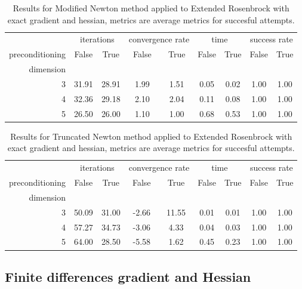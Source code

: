 \begin{table}
\centering
\caption{Results for Modified Newton method applied to Extended Rosenbrock with exact gradient and hessian, metrics are average metrics for succesful attempts.}
\label{tab:Modified_Newton_Extended_Rosenbrock_exact}
\begin{tabular}{r|cc|cc|cc|cc}
\toprule
    & \multicolumn{2}{|c}{iterations} & \multicolumn{2}{|c}{convergence rate} & \multicolumn{2}{|c}{time} & \multicolumn{2}{|c}{success rate} \\
preconditioning & False & True & False & True & False & True & False & True \\
dimension &  &  &  &  &  &  &  &  \\
\midrule
3 & 31.91 & 28.91 & 1.99 & 1.51 & 0.05 & 0.02 & 1.00 & 1.00 \\
4 & 32.36 & 29.18 & 2.10 & 2.04 & 0.11 & 0.08 & 1.00 & 1.00 \\
5 & 26.50 & 26.00 & 1.10 & 1.00 & 0.68 & 0.53 & 1.00 & 1.00 \\
\bottomrule
\end{tabular}
\end{table}

\begin{table}
\centering
\caption{Results for Truncated Newton method applied to Extended Rosenbrock with exact gradient and hessian, metrics are average metrics for succesful attempts.}
\label{tab:Truncated_Newton_Extended_Rosenbrock_exact}
\begin{tabular}{r|cc|cc|cc|cc}
\toprule
    & \multicolumn{2}{|c}{iterations} & \multicolumn{2}{|c}{convergence rate} & \multicolumn{2}{|c}{time} & \multicolumn{2}{|c}{success rate} \\
preconditioning & False & True & False & True & False & True & False & True \\
dimension &  &  &  &  &  &  &  &  \\
\midrule
3 & 50.09 & 31.00 & -2.66 & 11.55 & 0.01 & 0.01 & 1.00 & 1.00 \\
4 & 57.27 & 34.73 & -3.06 & 4.33 & 0.04 & 0.03 & 1.00 & 1.00 \\
5 & 64.00 & 28.50 & -5.58 & 1.62 & 0.45 & 0.23 & 1.00 & 1.00 \\
\bottomrule
\end{tabular}
\end{table}

\subsection{Finite differences gradient and Hessian}
\label{subsec:extended_rosenbrock_findiff}

